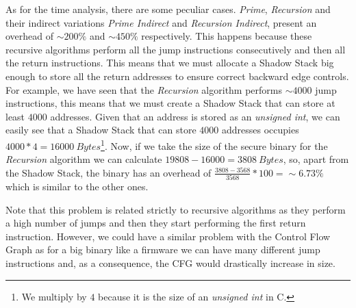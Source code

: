 As for the time analysis, there are some peculiar cases. \textit{Prime}, \textit{Recursion}
and their indirect variations \textit{Prime Indirect} and \textit{Recursion
Indirect}, present an overhead of $\sim 200\%$ and $\sim 450\%$ respectively.
This happens because these recursive algorithms perform all the jump
instructions consecutively and then all the return instructions. This means that
we must allocate a Shadow Stack big enough to store all the return addresses to ensure
correct backward edge controls. For example, we have seen that the \textit{Recursion}
algorithm performs $\sim 4000$ jump instructions, this means that we must create
a Shadow Stack that can store at least $4000$ addresses. Given that an address
is stored as an \textit{unsigned int}, we can easily see that a Shadow Stack
that can store $4000$ addresses occupies $4000*4 = 16000 \ \textit{Bytes}$\footnote{We
multiply by $4$ because it is the size of an \textit{unsigned int} in C.}. Now, if
we take the size of the secure binary for the \textit{Recursion} algorithm we
can calculate $19808 - 16000 = 380 8 \ \textit{Bytes}$, so, apart from the
Shadow Stack, the binary has an overhead of $\frac{3808-3568}{3568}*100 = \sim 6.
73\%$ which is similar to the other ones.

Note that this problem is related strictly to recursive algorithms as they perform
a high number of jumps and then they start performing the first return instruction.
However, we could have a similar problem with the Control Flow Graph as for a big
binary like a firmware we can have many different jump instructions and, as a
consequence, the CFG would drastically increase in size.

